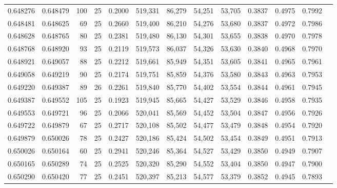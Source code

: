 \begin{tabular}{rrrrrrrrrrrrr}
0.648276 & 0.648479 &   100 &  25 &                                     0.2000 & 519,331 &  86,279 &  54,251 &  53,705 & 0.3837 & 0.4975 & 0.7992 \\
0.648481 & 0.648625 &    69 &  25 &                                     0.2660 & 519,400 &  86,210 &  54,276 &  53,680 & 0.3837 & 0.4972 & 0.7986 \\
0.648628 & 0.648765 &    80 &  25 &                                     0.2381 & 519,480 &  86,130 &  54,301 &  53,655 & 0.3838 & 0.4970 & 0.7978 \\
0.648768 & 0.648920 &    93 &  25 &                                     0.2119 & 519,573 &  86,037 &  54,326 &  53,630 & 0.3840 & 0.4968 & 0.7970 \\
0.648921 & 0.649057 &    88 &  25 &                                     0.2212 & 519,661 &  85,949 &  54,351 &  53,605 & 0.3841 & 0.4965 & 0.7961 \\
0.649058 & 0.649219 &    90 &  25 &                                     0.2174 & 519,751 &  85,859 &  54,376 &  53,580 & 0.3843 & 0.4963 & 0.7953 \\
0.649220 & 0.649387 &    89 &  26 &                                     0.2261 & 519,840 &  85,770 &  54,402 &  53,554 & 0.3844 & 0.4961 & 0.7945 \\
0.649387 & 0.649552 &   105 &  25 &                                     0.1923 & 519,945 &  85,665 &  54,427 &  53,529 & 0.3846 & 0.4958 & 0.7935 \\
0.649553 & 0.649721 &    96 &  25 &                                     0.2066 & 520,041 &  85,569 &  54,452 &  53,504 & 0.3847 & 0.4956 & 0.7926 \\
0.649722 & 0.649879 &    67 &  25 &                                     0.2717 & 520,108 &  85,502 &  54,477 &  53,479 & 0.3848 & 0.4954 & 0.7920 \\
0.649879 & 0.650026 &    78 &  25 &                                     0.2427 & 520,186 &  85,424 &  54,502 &  53,454 & 0.3849 & 0.4951 & 0.7913 \\
0.650026 & 0.650164 &    60 &  25 &                                     0.2941 & 520,246 &  85,364 &  54,527 &  53,429 & 0.3850 & 0.4949 & 0.7907 \\
0.650165 & 0.650289 &    74 &  25 &                                     0.2525 & 520,320 &  85,290 &  54,552 &  53,404 & 0.3850 & 0.4947 & 0.7900 \\
0.650290 & 0.650420 &    77 &  25 &                                     0.2451 & 520,397 &  85,213 &  54,577 &  53,379 & 0.3852 & 0.4945 & 0.7893 \\

\end{tabular}
